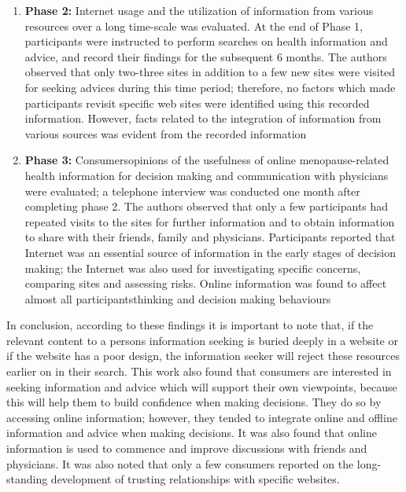 \documentclass[]{article}
\begin{document}
\begin{enumerate}
\begin{enumerate}
		\item \textbf{Phase 2:} Internet usage and the utilization of information from various resources over a long time-scale was evaluated. At the end of Phase 1, participants were instructed to perform searches on health information and advice, and record their findings for the subsequent 6 months. The authors observed that only two-three sites in addition to a few new sites were visited for seeking advices during this time period; therefore, no factors which made participants revisit specific web sites were identified using this recorded information. However, facts related to the integration of information from various sources was evident from the recorded information
		  
		\item \textbf{Phase 3:} Consumers\textquotesingle opinions of the usefulness of online menopause-related health information for decision making and communication with physicians were evaluated; a telephone interview was conducted one month after completing phase 2. The authors observed that only a few  participants had repeated visits to the sites for further information and to obtain information to share with their friends, family and physicians. Participants reported that Internet was an essential source of information in the early stages of decision making; the Internet was also used for investigating specific concerns, comparing sites and assessing risks. Online information was found to affect almost all participants\textquotesingle thinking and decision making behaviours   
\end{enumerate}  

In conclusion, according to these findings it is important to note that, if the relevant content to a person\textquotesingle s information seeking is buried deeply in a website or if the website has a poor design, the information seeker will reject these resources earlier on in their search. This work also found that consumers are interested in seeking information and advice which will support their own viewpoints, because this will help them to build confidence when making decisions. They do so by accessing online information; however, they tended to integrate online and offline information and advice when making decisions. It was also found that online information is used to commence and improve discussions with friends and physicians. It was also noted that only a few consumers reported on the long-standing development of trusting relationships with specific websites.     


\end{enumerate}
\end{document}
